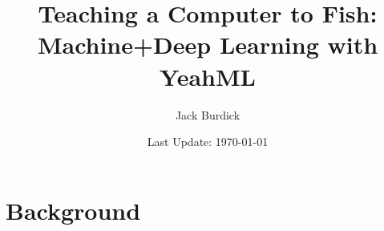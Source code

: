 \documentclass[12pt]{book}
\title{Teaching a Computer to Fish: Machine+Deep Learning with YeahML}
\author{Jack Burdick}
\date{Last Update: \today} %
\begin{document}
 
	
\frontmatter

\maketitle 

\tableofcontents


\mainmatter

\part{Background}











\end{document}

